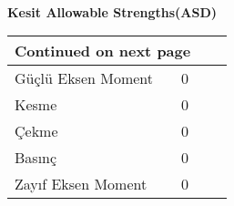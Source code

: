 \documentclass[12pt]{article}
\begin{document}
\\ {\Large \textbf{Kesit Allowable Strengths(ASD)}}\\ 
\begin{longtable}{|*{2}{l|l|}} 
\hline 
\hline 
\multicolumn{2}{|r|}{{Continued on next page}} \\ \hline 
\endfoot 
\endlastfoot 
\hline 
Güçlü Eksen Moment & 0 \\ 
\hline 
Kesme & 0 \\ 
\hline 
Çekme & 0 \\ 
\hline 
Basınç & 0 \\ 
\hline 
Zayıf Eksen Moment & 0 \\ 
\hline 
\end{longtable} 
\end{document}
